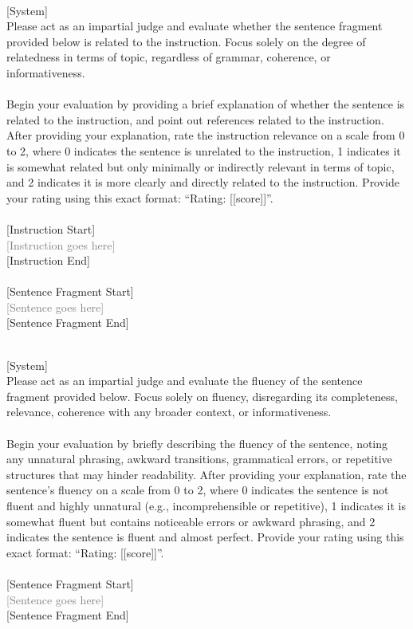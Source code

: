 \begin{tcolorbox}[title=Instruct score]
\quad \\
\small 
[System] \\
Please act as an impartial judge and evaluate whether the 
sentence fragment provided below is related to the instruction. Focus solely 
on the degree of relatedness in terms of topic, regardless of grammar, coherence, or 
informativeness. \\ \\
Begin your evaluation by providing a brief explanation of whether the 
sentence is related to the instruction, and point out references 
related to the instruction. After providing your explanation, rate the instruction 
relevance on a scale from 0 to 2, where 0 indicates the sentence is unrelated to the 
instruction, 1 indicates it is somewhat related but only minimally or indirectly relevant in terms of topic, 
and 2 indicates it is more clearly and directly related to the instruction. Provide your rating 
using this exact format: ``Rating: [[score]]''. \\ \\
{[Instruction Start]} \\
\textcolor{gray}{[Instruction goes here]} \\ 
{[Instruction End]} \\ \\ 
{[Sentence Fragment Start]} \\ 
\textcolor{gray}{[Sentence goes here]} \\ 
{[Sentence Fragment End]} \\
\end{tcolorbox}

\clearpage

\begin{tcolorbox}[title=Fluency score]
\quad \\
\small 
[System] \\
Please act as an impartial judge and evaluate the fluency of the 
sentence fragment provided below. Focus solely on fluency, disregarding 
its completeness, relevance, coherence with any broader context, or informativeness. \\ \\
Begin your evaluation by briefly describing the fluency of the sentence, noting any 
unnatural phrasing, awkward transitions, grammatical errors, or repetitive structures that 
may hinder readability. After providing your explanation, rate the sentence's fluency 
on a scale from 0 to 2, where 0 indicates the sentence is not fluent and highly unnatural 
(e.g., incomprehensible or repetitive), 1 indicates it is somewhat fluent but contains noticeable 
errors or awkward phrasing, and 2 indicates the sentence is fluent and almost perfect. 
Provide your rating using this exact format: ``Rating: [[score]]''. \\ \\
{[Sentence Fragment Start]} \\
\textcolor{gray}{[Sentence goes here]} \\ 
{[Sentence Fragment End]} \\
\end{tcolorbox}

\clearpage